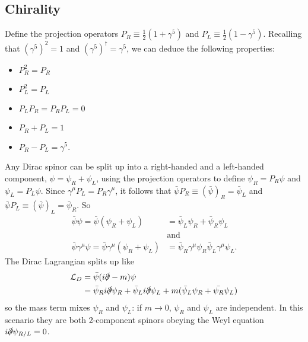 \documentclass[a4paper,12pt]{article}
\begin{document}
\subsection{Chirality}
%
Define the projection operators $P_R \equiv \frac{1}{2}(1 + \gamma^5)$ and $P_L \equiv \frac{1}{2}(1 - \gamma^5)$. Recalling that $(\gamma^5)^2 = 1$ and $(\gamma^5)^\dagger = \gamma^5$, we can deduce the following properties:
\begin{itemize}
    \item $P_R^2 = P_R$
    \item $P_L^2 = P_L$
    \item $P_LP_R = P_RP_L = 0$
    \item $P_R + P_L = 1$
    \item $P_R - P_L = \gamma^5$.
\end{itemize}
% 
Any Dirac spinor can be split up into a right-handed and a left-handed component, $\psi = \psi_R + \psi_L$, using the projection operators to define $\psi_R = P_R \psi$ and $\psi_L = P_L \psi$. Since $\gamma^\mu P_L = P_R \gamma^\mu$, it follows that $\bar{\psi} P_R \equiv (\bar{\psi})_R = \bar{\psi}_L$ and $\bar{\psi} P_L \equiv (\bar{\psi})_L = \bar{\psi}_R$. So 
\begin{equation}
\begin{split}
    \bar{\psi}\psi = \bar{\psi}(\psi_R + \psi_L) &= \bar{\psi}_L\psi_R + \bar{\psi}_R\psi_L \\
    &\text{and} \\
    \bar{\psi}\gamma^\mu \psi = \bar{\psi}\gamma^\mu(\psi_R + \psi_L) &= \bar{\psi}_R\gamma^\mu\psi_R 
    \bar{\psi}_L\gamma^\mu\psi_L.
\end{split}
\end{equation}
%
The Dirac Lagrangian splits up like 
\begin{equation}
\begin{split}
\mathcal{L}_D &= \bar{\psi}(i\slashed{\partial}-m)\psi \\ 
&= \bar{\psi}_R i\slashed{\partial}\psi_R + \bar{\psi}_L i\slashed{\partial}\psi_L
+ m(\bar{\psi}_L\psi_R + \bar{\psi_R}\psi_L)
\end{split}
\end{equation}
so the mass term mixes $\psi_R$ and $\psi_L$: if $m \to 0$, $\psi_R$ and $\psi_L$ are independent. In this scenario they are both 2-component spinors obeying the Weyl equation $i\slashed{\partial}\psi_{R/L} = 0$.
\end{document}
